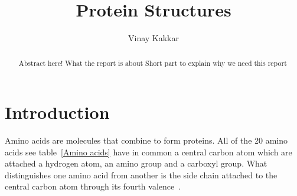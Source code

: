 \documentclass{report}
\title{Protein Structures}
\author{Vinay Kakkar}
\begin{document}
\maketitle

\tableofcontents

\begin{abstract}
Abstract here!
What the report is about
Short part to explain why we need this report
\end{abstract}

\section{Introduction}
Amino acids are molecules that combine to form proteins. All of the 20 amino acids see table~\ref{Amino acids} have in common a central carbon atom which are attached a hydrogen atom, an amino group and a carboxyl group. What distinguishes one amino acid from
another is the side chain attached to the central carbon atom through its fourth valence~\cite{branden_introduction_1998}.
\end{document}
